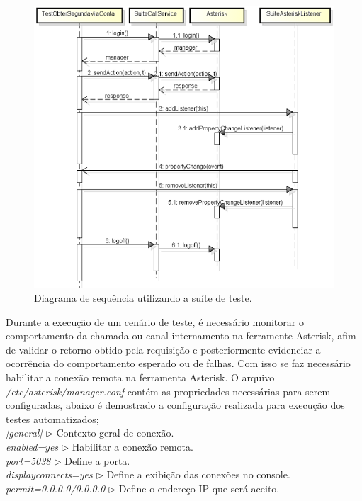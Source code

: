 \begin{figure}[H]
	\centering
	\caption{Diagrama de sequência utilizando a suíte de teste.}
	\label{figura:diagramaSeq2Via}
	\includegraphics{figuras/diagramaSequencia.png}
\end{figure}

Durante a execução de um cenário de teste, é necessário monitorar o comportamento da chamada ou canal internamento na ferramente Asterisk,
afim de validar o retorno obtido pela requisição e posteriormente evidenciar a ocorrência do comportamento esperado ou de falhas. Com isso se faz necessário habilitar a conexão remota na ferramenta Asterisk. O arquivo \textit{/etc/asterisk/manager.conf} contém as propriedades necessárias para serem configuradas, abaixo é demostrado a configuração realizada para execução dos testes automatizados;
\\
\hspace{10 mm}\textit{[general]} 			\hspace{10 mm} $\triangleright$ Contexto geral de conexão.\\
\hspace{10 mm}\textit{enabled=yes}  		\hspace{10 mm} $\triangleright$ Habilitar a conexão remota.\\
\hspace{10 mm}\textit{port=5038}  			\hspace{10 mm} $\triangleright$ Define a porta.\\
\hspace{10 mm}\textit{displayconnects=yes}  \hspace{10 mm} $\triangleright$ Define a exibição das conexões no console.\\
\hspace{10 mm}\textit{permit=0.0.0.0/0.0.0.0} \hspace{10 mm} $\triangleright$ Define o endereço IP que será aceito.\\

